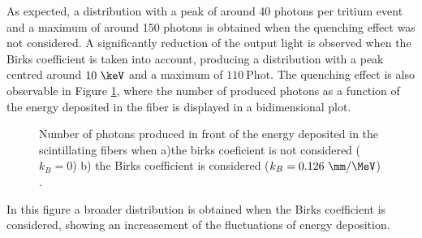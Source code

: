 As expected, a distribution with a peak of around 40 photons per tritium event and a maximum of around 150 photons is obtained when the quenching effect was not considered. A significantly reduction of the output light is observed when the Birks coefficient is taken into account, producing a distribution with a peak centred around $10~\keV$ and a maximum of $110~\text{Phot}$. The quenching effect is also observable in Figure \ref{fig:2DimPlotBirks}, where the number of produced photons as a function of the energy deposited in the fiber is displayed in a bidimensional plot.

\begin{figure}[h]
 \centering
 \caption{Number of photons produced in front of the energy deposited in the scintillating fibers when a)the birks coeficient is not considered ($k_B=0$) b) the Birks coefficient is considered ($k_B=0.126~\mm/\MeV$) \cite{SimulationPaperCarlos}.}
 \label{fig:2DimPlotBirks}
\end{figure}

In this figure a broader distribution is obtained when the Birks coefficient is considered, showing an increasement of the fluctuations of energy deposition.